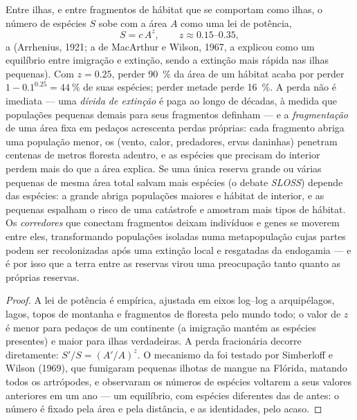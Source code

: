 \begin{proposition}\label{prop:b3:conservation-biology:area}
Entre ilhas, e entre fragmentos de hábitat que se comportam como ilhas, o
número de espécies $S$ sobe com a área $A$ como uma lei de potência,
\[
S = c\,A^{z}, \qquad z \approx 0.15\text{--}0.35,
\]
a \emph{} (Arrhenius, 1921; a 
de MacArthur e Wilson, 1967, a explicou como um equilíbrio entre
imigração e extinção, sendo a extinção mais rápida nas ilhas pequenas).
Com $z = 0.25$, perder \qty{90}{\%} da área de um hábitat acaba por
perder $1 - 0.1^{0.25} = \qty{44}{\%}$ de suas espécies; perder metade
perde \qty{16}{\%}. A perda não é imediata --- uma \emph{dívida de
extinção} é paga ao longo de décadas, à medida que populações pequenas
demais para seus fragmentos definham --- e a \emph{fragmentação} de uma
área fixa em pedaços acrescenta perdas próprias: cada fragmento abriga uma
população menor, os \emph{} (vento, calor, predadores,
ervas daninhas) penetram centenas de metros floresta adentro, e as
espécies que precisam do interior perdem mais do que a área explica. Se
uma única reserva grande ou várias pequenas de mesma área total salvam
mais espécies (o debate \emph{SLOSS}) depende das espécies: a grande
abriga populações maiores e hábitat de interior, e as pequenas espalham o
risco de uma catástrofe e amostram mais tipos de hábitat. Os
\emph{corredores} que conectam fragmentos deixam indivíduos e genes se
moverem entre eles, transformando populações isoladas numa metapopulação
cujas partes podem ser recolonizadas após uma extinção local e resgatadas
da endogamia --- e é por isso que a terra entre as reservas virou uma
preocupação tanto quanto as próprias reservas.
\end{proposition}
\begin{proof}
A lei de potência é empírica, ajustada em eixos log--log a arquipélagos,
lagos, topos de montanha e fragmentos de floresta pelo mundo todo; o
valor de $z$ é menor para pedaços de um continente (a imigração mantém as
espécies presentes) e maior para ilhas verdadeiras. A perda fracionária
decorre diretamente: $S'/S = (A'/A)^{z}$. O mecanismo da  foi testado por Simberloff e Wilson (1969), que fumigaram pequenas
ilhotas de mangue na Flórida, matando todos os artrópodes, e observaram
os números de espécies voltarem a seus valores anteriores em um ano ---
um equilíbrio, com espécies diferentes das de antes: o número é fixado
pela área e pela distância, e as identidades, pelo acaso.
\end{proof}

